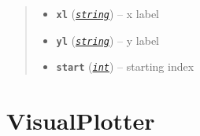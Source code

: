 \documentclass[letterpaper,10pt,english]{sphinxmanual}
\begin{document}
\begin{fulllineitems}
\begin{fulllineitems}
\begin{quote}
\begin{description}
\begin{itemize}
\item {} 
\textbf{\texttt{xl}} (\href{https://docs.python.org/library/string.html\#module-string}{\emph{\texttt{string}}}) -- x label

\item {} 
\textbf{\texttt{yl}} (\href{https://docs.python.org/library/string.html\#module-string}{\emph{\texttt{string}}}) -- y label

\item {} 
\textbf{\texttt{start}} (\href{https://docs.python.org/library/functions.html\#int}{\emph{\texttt{int}}}) -- starting index

\end{itemize}

\end{description}\end{quote}

\end{fulllineitems}


\end{fulllineitems}



\section{VisualPlotter}
\label{VisualPlotter:visualplotter}\label{VisualPlotter::doc}
\end{document}

